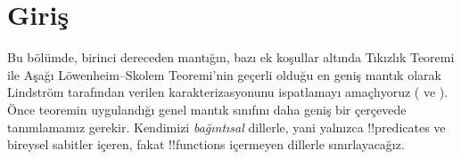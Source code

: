

\section{Giriş}

Bu bölümde, birinci dereceden mantığın, bazı ek koşullar altında Tıkızlık
Teoremi ile Aşağı L\"owenheim--Skolem Teoremi'nin geçerli olduğu en geniş
mantık olarak Lindstr\"om tarafından verilen karakterizasyonunu ispatlamayı
amaçlıyoruz ( ve
). Önce teoremin uygulandığı genel
mantık sınıfını daha geniş bir çerçevede tanımlamamız gerekir. Kendimizi
\emph{bağıntısal} dillerle, yani yalnızca !!{predicate}s ve bireysel sabitler
içeren, fakat !!{function}s içermeyen dillerle sınırlayacağız.

